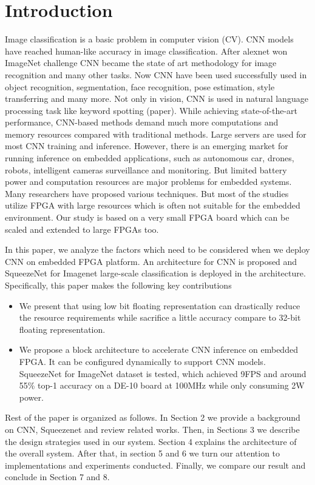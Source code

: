 \documentclass[conference]{IEEEtran}
\begin{document}
\section{Introduction}
Image classification is a basic problem in computer vision (CV). CNN models have reached human-like accuracy in image classification. After alexnet\cite{alexnet} won ImageNet challenge CNN became the state of art methodology for image recognition and many other tasks. Now CNN have been used successfully used in object recognition, segmentation, face recognition, pose estimation, style transferring and many more. Not only in vision, CNN is used in natural language processing task like keyword spotting (paper). While achieving state-of-the-art performance, CNN-based methods demand much more computations and memory resources compared with traditional methods. Large servers are used for most CNN training and inference. However, there is an emerging market for running inference on embedded applications, such as autonomous car, drones, robots, intelligent cameras surveillance and monitoring. But limited battery power and computation resources are major problems for embedded systems. Many researchers have proposed various techniques. But most of the studies utilize FPGA with large resources \cite{zynqnet} which is often not suitable for the embedded environment. Our study is based on a very small FPGA board which can be scaled and extended to large FPGAs too.


In this paper, we analyze the factors which need to be considered when we deploy CNN on embedded FPGA platform. An architecture for CNN is proposed and SqueezeNet for Imagenet large-scale classification is deployed in the architecture. Specifically, this paper makes the following key contributions

\begin{itemize}
\item
We present that using low bit floating representation can drastically reduce the resource requirements while sacrifice a little accuracy compare to 32-bit floating representation.
\item 
We propose a block architecture to accelerate CNN inference on embedded FPGA. It can be configured dynamically to support CNN models. SqueezeNet for ImageNet dataset is tested, which achieved 9FPS and around 55\% top-1 accuracy on a DE-10 board at 100MHz while only consuming 2W power.
\end{itemize}
Rest of the paper is organized as follows. In Section 2 we provide a background on CNN, Squeezenet and review related works. Then, in Sections 3 we describe the design strategies used in our system. Section 4 explains the architecture of the overall system. After that, in section 5 and 6 we turn our attention to implementations and experiments conducted.  Finally, we compare our result and conclude in Section 7 and 8.
\end{document}
